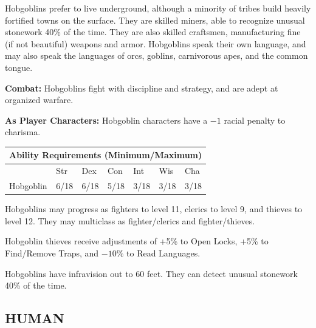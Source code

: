 \begin{multicols}{2}
Hobgoblins prefer to live underground, although a minority of tribes build heavily fortified towns on the surface. They are skilled miners, able to recognize unusual stonework 40\% of the time. They are also skilled craftsmen, manufacturing fine (if not beautiful) weapons and armor. Hobgoblins speak their own language, and may also speak the languages of orcs, goblins, carnivorous apes, and the common tongue.

\textbf{Combat:} Hobgoblins fight with discipline and strategy, and are adept at organized warfare.

\textbf{As Player Characters:} Hobgoblin characters have a $-1$ racial penalty to charisma.

\noindent \begin{minipage}{\columnwidth}

\noindent \begin{tabular}{|p{}|p{}|p{}|p{}|p{}|p{}|p{}|}
\multicolumn{7}{c}{Ability Requirements (Minimum/Maximum)} \\
\hline
	& Str	& Dex	& Con	& Int	& Wis	& Cha	\\
\hline\hline
\rowcolor[gray]{.9}Hobgoblin	& 6/18	& 6/18	& 5/18	& 3/18	& 3/18	& 3/18	\\
\hline
\end{tabular}

\end{minipage}

Hobgoblins may progress as fighters to level 11, clerics to level 9, and thieves to level 12. They may multiclass as fighter/clerics and fighter/thieves.

Hobgoblin thieves receive adjustments of +5\% to Open Locks, +5\% to Find/Remove Traps, and $-10$\% to Read Languages.

Hobgoblins have infravision out to 60 feet. They can detect unusual stonework 40\% of the time.

\noindent
\begin{minipage}{\columnwidth}

\vspace{1em}

\subsection{HUMAN}


\end{minipage}
\end{multicols}
